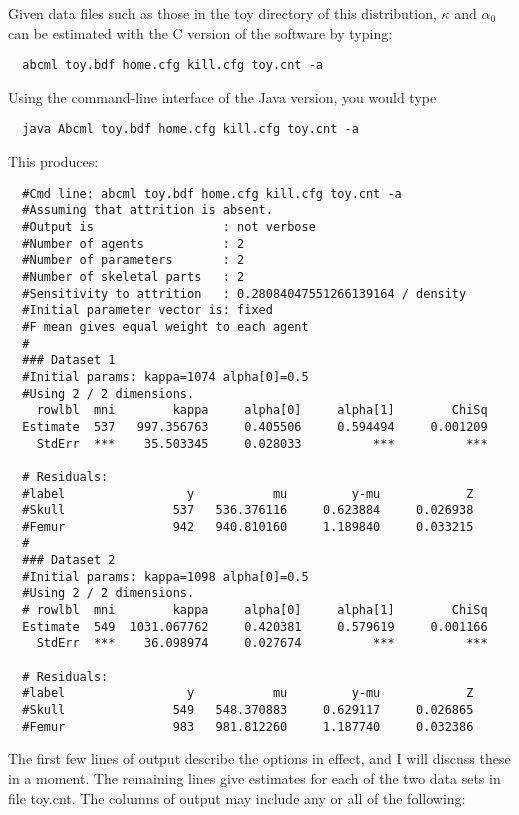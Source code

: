 Given data files such as those in the toy directory of this distribution,
$\kappa$ and $\alpha_0$ can be estimated with the C version of the software by
typing:
\begin{verbatim}
  abcml toy.bdf home.cfg kill.cfg toy.cnt -a
\end{verbatim}
Using the command-line interface of the Java version, you would type
\begin{verbatim}
  java Abcml toy.bdf home.cfg kill.cfg toy.cnt -a
\end{verbatim}
This produces:
\begin{verbatim}
  #Cmd line: abcml toy.bdf home.cfg kill.cfg toy.cnt -a
  #Assuming that attrition is absent.
  #Output is                  : not verbose
  #Number of agents           : 2
  #Number of parameters       : 2
  #Number of skeletal parts   : 2
  #Sensitivity to attrition   : 0.28084047551266139164 / density
  #Initial parameter vector is: fixed
  #F mean gives equal weight to each agent
  #
  ### Dataset 1
  #Initial params: kappa=1074 alpha[0]=0.5
  #Using 2 / 2 dimensions.
    rowlbl  mni        kappa     alpha[0]     alpha[1]        ChiSq
  Estimate  537   997.356763     0.405506     0.594494     0.001209
    StdErr  ***    35.503345     0.028033          ***          ***
  
  # Residuals:
  #label                 y           mu         y-mu            Z
  #Skull               537   536.376116     0.623884     0.026938
  #Femur               942   940.810160     1.189840     0.033215
  #
  ### Dataset 2
  #Initial params: kappa=1098 alpha[0]=0.5
  #Using 2 / 2 dimensions.
  # rowlbl  mni        kappa     alpha[0]     alpha[1]        ChiSq
  Estimate  549  1031.067762     0.420381     0.579619     0.001166
    StdErr  ***    36.098974     0.027674          ***          ***
  
  # Residuals:
  #label                 y           mu         y-mu            Z
  #Skull               549   548.370883     0.629117     0.026865
  #Femur               983   981.812260     1.187740     0.032386
\end{verbatim}
The first few lines of output describe the options in effect, and I
will discuss these in a moment.  The remaining lines give estimates
for each of the two data sets in file toy.cnt.  The columns of output
may include any or all of the following:  
